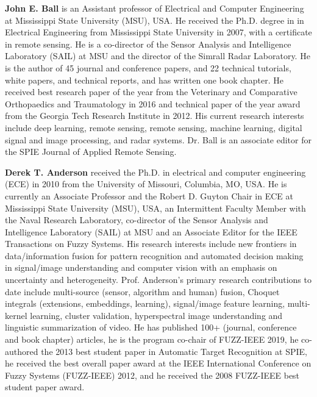 \documentclass[12pt]{spieman}
\begin{document}
\begin{spacing}{1}
%
%
\vspace{2ex}\noindent\textbf{John E. Ball} is an Assistant professor of Electrical and Computer Engineering at Mississippi State University (MSU), USA. He received the Ph.D. degree in in Electrical Engineering from Mississippi State University in 2007, with a certificate in remote sensing. He is a co-director of the Sensor Analysis and Intelligence Laboratory (SAIL) at MSU and the director of the Simrall Radar Laboratory. He is the author of 45 journal and conference papers, and 22 technical tutorials, white papers, and technical reports, and has written one book chapter. He received best research paper of the year from the Veterinary and Comparative Orthopaedics and Traumatology in 2016 and technical paper of the year award from the Georgia Tech Research Institute in 2012. His current research interests include deep learning, remote sensing, remote sensing, machine learning, digital signal and image processing, and radar systems. Dr. Ball is an associate editor for the SPIE Journal of Applied Remote Sensing. 

\vspace{1ex}
\vspace{2ex}\noindent\textbf{Derek T. Anderson} received the Ph.D. in electrical and computer engineering (ECE) in 2010 from the University of Missouri, Columbia, MO, USA. He is currently an Associate Professor and the Robert D. Guyton Chair in ECE at Mississippi State University (MSU), USA, an Intermittent Faculty Member with the Naval Research Laboratory, co-director of the Sensor Analysis and Intelligence Laboratory (SAIL) at MSU and an Associate Editor for the IEEE Transactions on Fuzzy Systems. His research interests include new frontiers in data/information fusion for pattern recognition and automated decision making in signal/image understanding and computer vision with an emphasis on uncertainty and heterogeneity. Prof. Anderson's primary research contributions to date include multi-source (sensor, algorithm and human) fusion, Choquet integrals (extensions, embeddings, learning), signal/image feature learning, multi-kernel learning, cluster validation, hyperspectral image understanding and linguistic summarization of video. He has published 100+ (journal, conference and book chapter) articles, he is the program co-chair of FUZZ-IEEE 2019, he co-authored the 2013 best student paper in Automatic Target Recognition at SPIE, he received the best overall paper award at the IEEE International Conference on Fuzzy Systems (FUZZ-IEEE) 2012, and he received the 2008 FUZZ-IEEE best student paper award.


\end{spacing}
\end{document}

